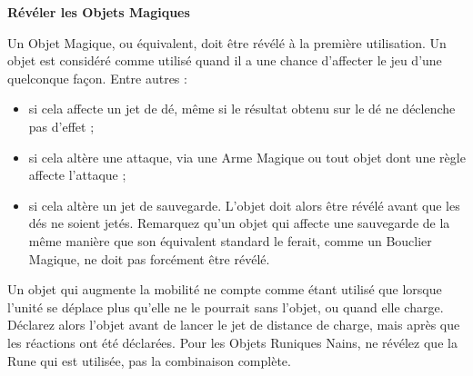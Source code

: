 \noindent\textbf{Révéler les Objets Magiques}

Un Objet Magique, ou équivalent, doit être révélé à la première utilisation. Un objet est considéré comme utilisé quand il a une chance d'affecter le jeu d'une quelconque façon. Entre autres :
\begin{itemize}[label={-}]
\item si cela affecte un jet de dé, même si le résultat obtenu sur le dé ne déclenche pas d'effet ;
\item si cela altère une attaque, via une Arme Magique ou tout objet dont une règle affecte l'attaque ;
\item si cela altère un jet de sauvegarde. L'objet doit alors être révélé avant que les dés ne soient jetés. Remarquez qu'un objet qui affecte une sauvegarde de la même manière que son équivalent standard le ferait, comme un Bouclier Magique, ne doit pas forcément être révélé.
\end{itemize}

Un objet qui augmente la mobilité ne compte comme étant utilisé que lorsque l'unité se déplace plus qu'elle ne le pourrait sans l'objet, ou quand elle charge. Déclarez alors l'objet avant de lancer le jet de distance de charge, mais après que les réactions ont été déclarées. Pour les Objets Runiques Nains, ne révélez que la Rune qui est utilisée, pas la combinaison complète.

